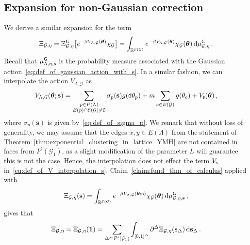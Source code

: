 \documentclass[11pt]{article}
\theoremstyle{definition}
\theoremstyle{remark}
\numberwithin{theorem}{section}
\def\La{{\Lambda}}
\newcommand{\bR}{\mathbb R}
\newcommand{\bE}{\mathbb E}
\newcommand{\cE}{\mathcal{E}}
\begin{document}
    \subsection{Expansion for non-Gaussian correction} \label{subsection:expansion_for_non_gaussian_correction}
    We derive a similar expansion for the term 
    \[
    \Xi_{\mathcal{G},\eta} = \bE_{\mathcal{G},\eta}^{\sf G}\big[e^{-\beta V_{\Lambda,\mathcal{G}}(\boldsymbol{\theta})} \chi_{\mathcal{G}}\big] = \int_{\bR^{\cE(\mathcal{G})}}e^{-\beta V_{\Lambda,\mathcal{G}}(\boldsymbol{\theta})} \chi_{\mathcal{G}}(\boldsymbol{\theta}) \, {\rm d}\mu_{\mathcal{G},\eta}^{\sf G} \, .
    \]
    Recall that $\mu_{\Lambda,\eta,\mathbf{s}}^{\sf G}$ is the probability measure associated with the Gaussian action~\eqref{eq:def_of_gaussian_action_with_s}. In a similar fashion, we can interpolate the action $V_{\La,\mathcal{G}}$ as
    \begin{equation}
        \label{eq:def_of_V_interpolation_s}
        V_{\Lambda,\mathcal{G}}(\boldsymbol\theta;\mathbf{s}) = \sum_{\substack{p\in P(\Lambda) \\ E(p)\cap \cE(\mathcal{G}) \not= \emptyset}} \sigma_p(\mathbf{s})  g({\sf d}\theta_p) + m \sum_{e\in E(\mathcal{G})} g(\theta_e)  + V_{{\sf s}}(\boldsymbol\theta)\, , 
    \end{equation}
    where $\sigma_p(\mathbf{s})$ is given by~\eqref{eq:def_of_sigma_p}. We remark that without loss of generality, we may assume that the edges $x,y\in E(\Lambda)$ from the statement of Theorem~\ref{thm:exponential_clustering_in_lattice_YMH} are not contained in faces from $P^\prime(\mathcal{G}_1)$, as a slight modification of the parameter $L$ will guarantee this is not the case. Hence, the interpolation does not effect the term $V_{\sf s}$ in~\eqref{eq:def_of_V_interpolation_s}. Claim~\ref{claim:fund_thm_of_calculus} applied with
    \begin{equation}
    \label{eq:def_of_Xi_with_interpolation_s}
        \Xi_{\mathcal{G},\eta}(\mathbf{s}) = \int_{\bR^{\cE(\mathcal{G})}}e^{-\beta V_{\Lambda,\mathcal{G}}(\boldsymbol{\theta};\mathbf{s})} \chi_{\mathcal{G}}(\boldsymbol{\theta}) \, {\rm d}\mu_{\mathcal{G},\eta,\mathbf{s}}^{\sf G}  \, ,
    \end{equation}
    gives that
    \begin{equation}
    \label{eq:Xi_after_fund_thm_of_calculus}
        \Xi_{\mathcal{G},\eta} = \Xi_{\mathcal{G},\eta}(\mathbf{1}) = \sum_{\Delta\subset P^\prime(\mathcal{G}_1)} \int_{[0,1]^\Delta} \partial^\Delta \Xi_{\mathcal{G},\eta}(\mathbf{s}_{\Delta}) \, {\rm d} \mathbf{s}_\Delta \, .
    \end{equation}
\end{document}
